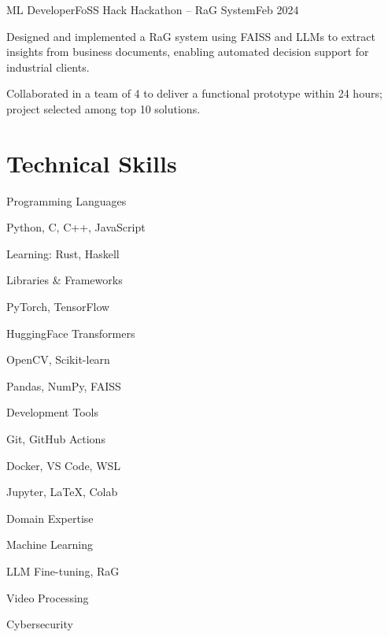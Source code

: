 \documentclass[10pt, letterpaper]{article}
\begin{document}
\begin{experienceentry}{ML Developer}{FoSS Hack Hackathon – RaG System}{Feb 2024}
    \item Designed and implemented a RaG system using FAISS and LLMs to extract insights from business documents, enabling automated decision support for industrial clients.
    \item Collaborated in a team of 4 to deliver a functional prototype within 24 hours; project selected among top 10 solutions.
\end{experienceentry}

\section{Technical Skills}
\begin{minipage}{\linewidth}
\begin{multicols}{2}
    \begin{skillsection}{Programming Languages}
        \item Python, C, C++, JavaScript
        \item Learning: Rust, Haskell
    \end{skillsection}
    
    \begin{skillsection}{Libraries \& Frameworks}
        \item PyTorch, TensorFlow
        \item HuggingFace Transformers
        \item OpenCV, Scikit-learn
        \item Pandas, NumPy, FAISS
    \end{skillsection}

    \columnbreak

    \begin{skillsection}{Development Tools}
        \item Git, GitHub Actions
        \item Docker, VS Code, WSL
        \item Jupyter, LaTeX, Colab
    \end{skillsection}
    
    \begin{skillsection}{Domain Expertise}
        \item Machine Learning
        \item LLM Fine-tuning, RaG
        \item Video Processing
        \item Cybersecurity
    \end{skillsection}
\end{multicols}
\end{minipage}
\end{document}
